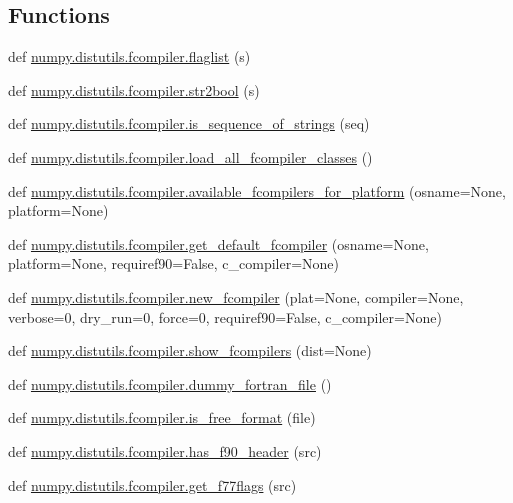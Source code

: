 \subsection*{Functions}
\begin{DoxyCompactItemize}
\item 
def \hyperlink{namespacenumpy_1_1distutils_1_1fcompiler_a86a775a3bb693cefb74038c84560a958}{numpy.\+distutils.\+fcompiler.\+flaglist} (s)
\item 
def \hyperlink{namespacenumpy_1_1distutils_1_1fcompiler_a181ca53e6e1b8a0b6daa0f2ed12eaca2}{numpy.\+distutils.\+fcompiler.\+str2bool} (s)
\item 
def \hyperlink{namespacenumpy_1_1distutils_1_1fcompiler_afb88b2a981e280b01d9a48f5950c1952}{numpy.\+distutils.\+fcompiler.\+is\+\_\+sequence\+\_\+of\+\_\+strings} (seq)
\item 
def \hyperlink{namespacenumpy_1_1distutils_1_1fcompiler_aa27381238f64e75e39e7bea89394161e}{numpy.\+distutils.\+fcompiler.\+load\+\_\+all\+\_\+fcompiler\+\_\+classes} ()
\item 
def \hyperlink{namespacenumpy_1_1distutils_1_1fcompiler_a5d010bfdc18ef8a8715c389b3e5ac94c}{numpy.\+distutils.\+fcompiler.\+available\+\_\+fcompilers\+\_\+for\+\_\+platform} (osname=None, platform=None)
\item 
def \hyperlink{namespacenumpy_1_1distutils_1_1fcompiler_a39ce48aec442d55137a840da6d41c1d9}{numpy.\+distutils.\+fcompiler.\+get\+\_\+default\+\_\+fcompiler} (osname=None, platform=None, requiref90=False, c\+\_\+compiler=None)
\item 
def \hyperlink{namespacenumpy_1_1distutils_1_1fcompiler_acb202e9bb6aa4e32fdadae297a70dea7}{numpy.\+distutils.\+fcompiler.\+new\+\_\+fcompiler} (plat=None, compiler=None, verbose=0, dry\+\_\+run=0, force=0, requiref90=False, c\+\_\+compiler=None)
\item 
def \hyperlink{namespacenumpy_1_1distutils_1_1fcompiler_af5d3c4731ff534c3474a2b9b5ebd9847}{numpy.\+distutils.\+fcompiler.\+show\+\_\+fcompilers} (dist=None)
\item 
def \hyperlink{namespacenumpy_1_1distutils_1_1fcompiler_ac54179f557a1d50edbcadd4ad6f463c0}{numpy.\+distutils.\+fcompiler.\+dummy\+\_\+fortran\+\_\+file} ()
\item 
def \hyperlink{namespacenumpy_1_1distutils_1_1fcompiler_ae533d78390900140c28f30b64dcb53ef}{numpy.\+distutils.\+fcompiler.\+is\+\_\+free\+\_\+format} (file)
\item 
def \hyperlink{namespacenumpy_1_1distutils_1_1fcompiler_a957a24c960c8b0f6bb2c69332f1c2e8b}{numpy.\+distutils.\+fcompiler.\+has\+\_\+f90\+\_\+header} (src)
\item 
def \hyperlink{namespacenumpy_1_1distutils_1_1fcompiler_a740db028b25a106e9171a210213e6558}{numpy.\+distutils.\+fcompiler.\+get\+\_\+f77flags} (src)
\end{DoxyCompactItemize}
